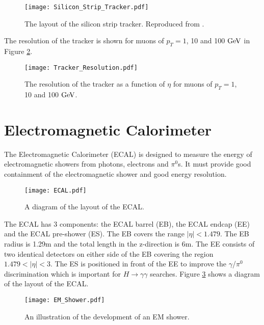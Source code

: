 \begin{figure}
\texttt{[image: Silicon\_Strip\_Tracker.pdf]}
\caption{The layout of the silicon strip tracker. Reproduced from 
\cite{physics_tdr_1}.}
\label{fig:Silicon_Strip_Tracker}
\end{figure}

The resolution of the tracker is shown for muons of $p_{T} = 1$, 10 and 100 
$\mbox{GeV}$ in Figure \ref{fig:tracker_resolution}.

\begin{figure}
\texttt{[image: Tracker\_Resolution.pdf]}
\caption{The resolution of the tracker as a function of $\eta$ for muons of
$p_{T} = 1$, 10 and 100 $\mbox{GeV}$.}
\label{fig:tracker_resolution}
\end{figure}

\section{Electromagnetic Calorimeter}

The Electromagnetic Calorimeter (ECAL) is designed to measure the energy of
electromagnetic showers from photons, electrons and $\pi^{0}$s. It must provide
good containment of the electromagnetic shower and good energy resolution. \\

\begin{figure}
\begin{center}
\texttt{[image: ECAL.pdf]}
\end{center}
\caption{A diagram of the layout of the ECAL.}
\label{fig:ECAL}
\end{figure}

The ECAL has 3 components: the ECAL barrel (EB), the ECAL endcap (EE) and the
ECAL pre-shower (ES). The EB covers the range $|\eta| < 1.479$. The EB radius is
1.29m and the total length in the z-direction is 6m. The EE consists of two 
identical detectors on either side of the EB covering the region $1.479 < |\eta|
< 3$. The ES is positioned in front of the EE to improve the $\gamma$/$\pi^{0}$ 
discrimination which is important for $H\rightarrow\gamma\gamma$ searches. 
Figure \ref{fig:ECAL} shows a diagram of the layout of the ECAL. \\

\begin{figure}
\begin{center}
\texttt{[image: EM\_Shower.pdf]}
\end{center}
\caption{An illustration of the development of an EM shower.}
\label{fig:em_shower}
\end{figure}

